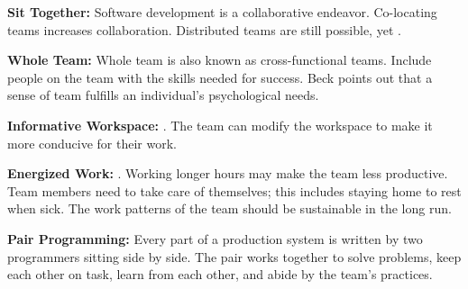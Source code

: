 \textbf{Sit Together:} Software development is a collaborative endeavor. Co-locating teams increases collaboration. Distributed teams are still possible, yet   \cite{BeckExtremeProgramming2004}. 


\textbf{Whole Team:} Whole team is also known as cross-functional teams. Include people on the team with the skills needed for success. Beck points out that a sense of team fulfills an individual’s psychological needs.  \cite{BeckExtremeProgramming2004}
 


\textbf{Informative Workspace:}  \cite{BeckExtremeProgramming2004}. The team can modify the workspace to make it more conducive for their work. 


\textbf{Energized Work:}  \cite{BeckExtremeProgramming2004}. Working longer hours may make the team less productive. Team members need to take care of themselves; this includes staying home to rest when sick. The work patterns of the team should be sustainable in the long run.

\textbf{Pair Programming:} Every part of a production system is written by two programmers sitting side by side. The pair works together to solve problems, keep each other on task, learn from each other, and abide by the team’s practices.

